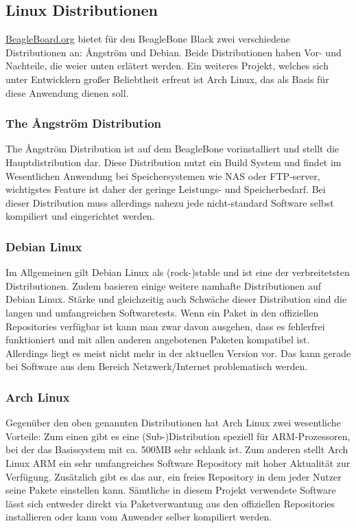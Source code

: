\subsection{Linux Distributionen}
\href{http://beagleboard.org/}{BeagleBoard.org} bietet für den BeagleBone Black zwei verschiedene Distributionen an: {\AA}ngström und Debian. Beide Distributionen haben Vor- und Nachteile, die weier unten erlätert werden. Ein weiteres Projekt, welches sich unter Entwicklern großer Beliebtheit erfreut ist Arch Linux, das als Basis für diese Anwendung dienen soll.

\subsubsection{The {\AA}ngström Distribution}
The {\AA}ngström Distribution ist auf dem BeagleBone vorinstalliert und stellt die Hauptdistribution dar. Diese Distribution nutzt ein Build System und findet im Wesentlichen Anwendung bei Speichersystemen wie NAS oder FTP-server, wichtigstes Feature ist daher der geringe Leistungs- und Speicherbedarf. Bei dieser Distribution muss allerdings nahezu jede nicht-standard Software selbst kompiliert und eingerichtet werden.

\subsubsection{Debian Linux}
Im Allgemeinen gilt Debian Linux als (rock-)stable und ist eine der verbreitetsten Distributionen. Zudem basieren einige weitere namhafte Distributionen auf Debian Linux. Stärke und gleichzeitig auch Schwäche dieser Distribution sind die langen und umfangreichen Softwaretests. Wenn ein Paket in den offiziellen Repositories verfügbar ist kann man zwar davon ausgehen, dass es fehlerfrei funktioniert und mit allen anderen angebotenen Paketen kompatibel ist. Allerdings liegt es meist nicht mehr in der aktuellen Version vor. Das kann gerade bei Software aus dem Bereich Netzwerk/Internet problematisch werden.

\subsubsection{Arch Linux}
Gegenüber den oben genannten Distributionen hat Arch Linux zwei wesentliche Vorteile: Zum einen gibt es eine (Sub-)Distribution speziell für ARM-Prozessoren, bei der das Basissystem mit ca. 500MB sehr schlank ist. Zum anderen stellt Arch Linux ARM ein sehr umfangreiches Software Repository mit hoher Aktualität zur Verfügung. Zusätzlich gibt es das \gls{aur}, ein freies Repository in dem jeder Nutzer seine Pakete einstellen kann. Sämtliche in diesem Projekt verwendete Software lässt sich entweder direkt via Paketverwantung aus den offiziellen Repositories installieren oder kann vom Anwender selber kompiliert werden.

